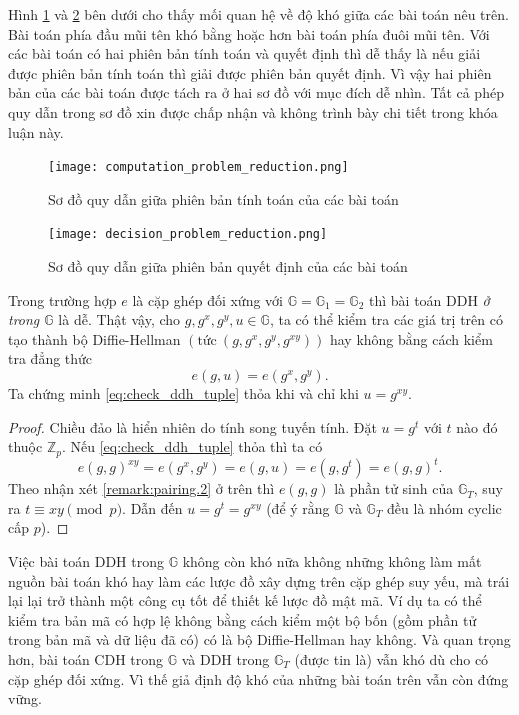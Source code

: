 \documentclass[class=report, crop=false]{standalone}
\begin{document}
		Hình \ref{fig:computation_reduction} và \ref{fig:decision_reduction} bên dưới cho thấy mối quan hệ về độ khó giữa các bài toán nêu trên. Bài toán phía đầu mũi tên khó bằng hoặc hơn bài toán phía đuôi mũi tên. Với các bài toán có hai phiên bản tính toán và quyết định thì dễ thấy là nếu giải được phiên bản tính toán thì giải được phiên bản quyết định. Vì vậy hai phiên bản của các bài toán được tách ra ở hai sơ đồ với mục đích dễ nhìn. Tất cả phép quy dẫn trong sơ đồ xin được chấp nhận và không trình bày chi tiết trong khóa luận này.
		\begin{figure}[h] 
			\captionsetup{font=normalsize}
			\texttt{[image: computation\_problem\_reduction.png]}
			\centering
			\caption{Sơ đồ quy dẫn giữa phiên bản tính toán của các bài toán}
			\label{fig:computation_reduction}
		\end{figure}
		\begin{figure}[h]
			\captionsetup{font=normalsize}
			\texttt{[image: decision\_problem\_reduction.png]}
			\centering
			\caption{Sơ đồ quy dẫn giữa phiên bản quyết định của các bài toán}
			\label{fig:decision_reduction}
		\end{figure}
		\newpage
		\begin{remark}
			Trong trường hợp $e$ là cặp ghép đối xứng với $\mathbb{G} = \mathbb{G}_1 = \mathbb{G}_2$ thì bài toán DDH \emph{ở trong $\mathbb{G}$} là dễ. Thật vậy, cho $g, g^x, g^y, u \in \mathbb{G}$, ta có thể kiểm tra các giá trị trên có tạo thành bộ Diffie-Hellman $(\text{tức}\ (g, g^x, g^y, g^{xy}))$ hay không bằng cách kiểm tra đẳng thức
			\begin{equation}
				e(g, u) = e(g^x, g^y). \tag{*}\label{eq:check_ddh_tuple}
			\end{equation} \indent
			Ta chứng minh \eqref{eq:check_ddh_tuple} thỏa khi và chỉ khi $u = g^{xy}$.
			\vspace{-\baselineskip}
			\begin{proof}
				Chiều đảo là hiển nhiên do tính song tuyến tính. Đặt $u = g^t$ với $t$ nào đó thuộc $\mathbb{Z}_p$. Nếu \eqref{eq:check_ddh_tuple} thỏa thì ta có
				\[
					e(g, g)^{xy} = e(g^x, g^y) = e(g, u) = e(g, g^t) = e(g, g)^t.
				\]
				Theo nhận xét \ref{remark:pairing.2} ở trên thì $e(g, g)$ là phần tử sinh của $\mathbb{G}_T$, suy ra $t \equiv xy \pmod{p}$. Dẫn đến $u = g^t = g^{xy}$ (để ý rằng $\mathbb{G}$ và $\mathbb{G}_T$ đều là nhóm cyclic cấp $p$).
			\end{proof}
			\vspace{-\baselineskip}
			Việc bài toán DDH trong $\mathbb{G}$ không còn khó nữa không những không làm mất nguồn bài toán khó hay làm các lược đồ xây dựng trên cặp ghép suy yếu, mà trái lại lại trở thành một công cụ tốt để thiết kế lược đồ mật mã. Ví dụ ta có thể kiểm tra bản mã có hợp lệ không bằng cách kiểm một bộ bốn (gồm phần tử trong bản mã và dữ liệu đã có) có là bộ Diffie-Hellman hay không. Và quan trọng hơn, bài toán CDH trong $\mathbb{G}$ và DDH trong $\mathbb{G}_T$ (được tin là) vẫn khó dù cho có cặp ghép đối xứng. Vì thế giả định độ khó của những bài toán trên vẫn còn đứng vững.
		\end{remark}
\end{document}
